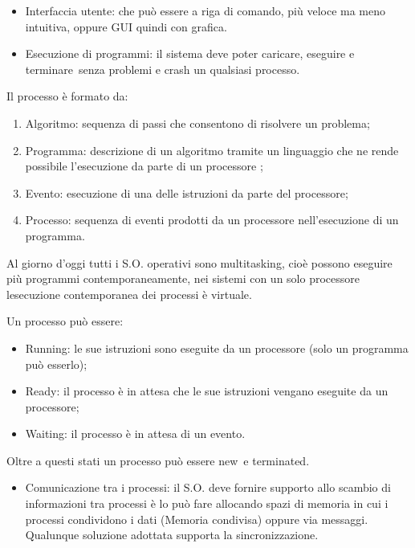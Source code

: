 \documentclass[
]{article}
\providecommand{\tightlist}{%
  \setlength{\itemsep}{0pt}\setlength{\parskip}{0pt}}
\begin{document}
\begin{itemize}
\tightlist
\item
  {Interfaccia utente}{: che può essere a riga di comando, più veloce ma
  meno intuitiva, oppure GUI quindi con grafica.}
\end{itemize}

{}

\begin{itemize}
\tightlist
\item
  {Esecuzione di programmi}{: il sistema deve poter }{caricare, eseguire
  e terminare}{~senza problemi e crash un qualsiasi processo.}
\end{itemize}

{Il processo è formato da:}

\begin{enumerate}
\tightlist
\item
  {Algoritmo: sequenza di passi che consentono di risolvere un
  problema;}
\item
  {Programma: descrizione di un algoritmo tramite un linguaggio che ne
  rende possibile l'esecuzione da parte di un processore ;}
\item
  {Evento: esecuzione di una delle istruzioni da parte del processore;}
\item
  {Processo: sequenza di eventi prodotti da un processore
  nell'esecuzione di un programma.}
\end{enumerate}

{Al giorno d'oggi tutti i S.O. operativi sono multitasking, cioè possono
eseguire più programmi contemporaneamente, nei sistemi con un solo
processore l\textquotesingle esecuzione contemporanea dei processi è
virtuale.}

{Un processo può essere:}

\begin{itemize}
\tightlist
\item
  {Running}{: le sue istruzioni sono eseguite da un processore (solo un
  programma può esserlo);}
\item
  {Ready}{: il processo è in attesa che le sue istruzioni vengano
  eseguite da un processore;}
\item
  {Waiting}{: il processo è in attesa di un evento.}
\end{itemize}

{Oltre a questi stati un processo può essere }{new}{~e }{terminated}{.}

{}

\begin{itemize}
\tightlist
\item
  {Comunicazione tra i processi}{: il S.O. deve fornire supporto allo
  scambio di informazioni tra processi è lo può fare allocando spazi di
  memoria in cui i processi condividono i dati (Memoria condivisa)
  oppure via messaggi. Qualunque soluzione adottata supporta la
  sincronizzazione.}
\end{itemize}
\end{document}
